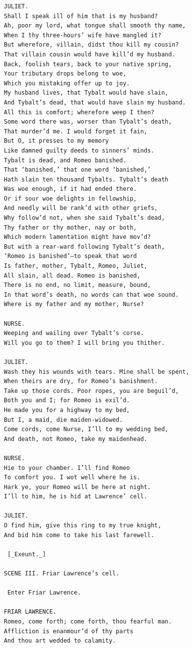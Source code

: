 \documentclass{article}
\begin{document}
\begin{verbatim}
JULIET.
Shall I speak ill of him that is my husband?
Ah, poor my lord, what tongue shall smooth thy name,
When I thy three-hours’ wife have mangled it?
But wherefore, villain, didst thou kill my cousin?
That villain cousin would have kill’d my husband.
Back, foolish tears, back to your native spring,
Your tributary drops belong to woe,
Which you mistaking offer up to joy.
My husband lives, that Tybalt would have slain,
And Tybalt’s dead, that would have slain my husband.
All this is comfort; wherefore weep I then?
Some word there was, worser than Tybalt’s death,
That murder’d me. I would forget it fain,
But O, it presses to my memory
Like damned guilty deeds to sinners’ minds.
Tybalt is dead, and Romeo banished.
That ‘banished,’ that one word ‘banished,’
Hath slain ten thousand Tybalts. Tybalt’s death
Was woe enough, if it had ended there.
Or if sour woe delights in fellowship,
And needly will be rank’d with other griefs,
Why follow’d not, when she said Tybalt’s dead,
Thy father or thy mother, nay or both,
Which modern lamentation might have mov’d?
But with a rear-ward following Tybalt’s death,
‘Romeo is banished’—to speak that word
Is father, mother, Tybalt, Romeo, Juliet,
All slain, all dead. Romeo is banished,
There is no end, no limit, measure, bound,
In that word’s death, no words can that woe sound.
Where is my father and my mother, Nurse?

NURSE.
Weeping and wailing over Tybalt’s corse.
Will you go to them? I will bring you thither.

JULIET.
Wash they his wounds with tears. Mine shall be spent,
When theirs are dry, for Romeo’s banishment.
Take up those cords. Poor ropes, you are beguil’d,
Both you and I; for Romeo is exil’d.
He made you for a highway to my bed,
But I, a maid, die maiden-widowed.
Come cords, come Nurse, I’ll to my wedding bed,
And death, not Romeo, take my maidenhead.

NURSE.
Hie to your chamber. I’ll find Romeo
To comfort you. I wot well where he is.
Hark ye, your Romeo will be here at night.
I’ll to him, he is hid at Lawrence’ cell.

JULIET.
O find him, give this ring to my true knight,
And bid him come to take his last farewell.

 [_Exeunt._]

SCENE III. Friar Lawrence’s cell.

 Enter Friar Lawrence.

FRIAR LAWRENCE.
Romeo, come forth; come forth, thou fearful man.
Affliction is enanmour’d of thy parts
And thou art wedded to calamity.


\end{verbatim}
\end{document}
